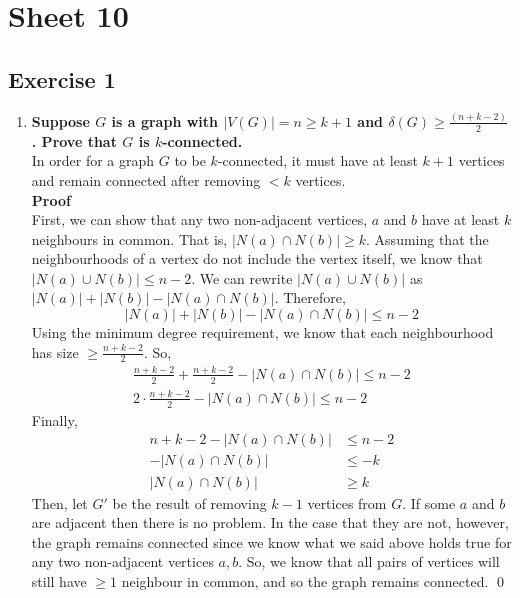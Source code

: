 \section*{Sheet 10}
\subsection*{Exercise 1}
\begin{enumerate}[label=\textbf{(\alph*)}]    \boldmath
    \item \textbf{Suppose $G$ is a graph with $|V(G)| = n \geq k + 1$ and $\delta(G) \geq \frac{(n + k - 2)}{2}$. Prove that $G$ is $k$-connected.}
    \unboldmath \\
    \linebreak 
    In order for a graph $G$ to be $k$-connected, it must have at least $k+1$ vertices and remain connected after removing $<k$ vertices. \\
    \linebreak 
    \textbf{Proof}\\
    First, we can show that any two non-adjacent vertices, $a$ and $b$ have at least $k$ neighbours in common. That is, $|N(a) \cap N(b)| \geq k$. Assuming that the neighbourhoods of a vertex do not include the vertex itself, we know that $|N(a) \cup N(b)| \leq n-2$. We can rewrite $|N(a) \cup N(b)|$ as $|N(a)| + |N(b)| - |N(a) \cap N(b)|$. Therefore, \\
    \begin{equation}
       |N(a)| + |N(b)| - |N(a) \cap N(b)| \leq n-2
    \end{equation}
    Using the minimum degree requirement, we know that each neighbourhood has size $\geq \frac{n+k-2}{2}$. So, 
    \begin{align*}
        \frac{n+k-2}{2} + \frac{n+k-2}{2} - |N(a) \cap N(b)| \leq n-2 
        \\
        2 \cdot \frac{n+k-2}{2} - |N(a) \cap N(b)| \leq n-2
    \end{align*}
    Finally, 
    \begin{align*}
        n + k - 2 - |N(a) \cap N(b)| &\leq n - 2 \\
        -|N(a) \cap N(b)| &\leq - k \\
        |N(a) \cap N(b)| &\geq k
    \end{align*}
    Then, let $G'$ be the result of removing $k-1$ vertices from $G$. If some $a$ and $b$ are adjacent then there is no problem. In the case that they are not, however, the graph remains connected since we know what we said above holds true for any two non-adjacent vertices $a, b$. So, we know that all pairs of vertices will still have $\geq 1$ neighbour in common, and so the graph remains connected. \qed 

\end{enumerate}
